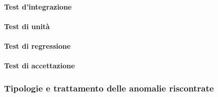 			\paragraph{Test d'integrazione} %
			
			\paragraph{Test di unità} %
			
			\paragraph{Test di regressione} %
			
			\paragraph{Test di accettazione} %
		
		
		\subsubsection{Tipologie e trattamento delle anomalie riscontrate} %
